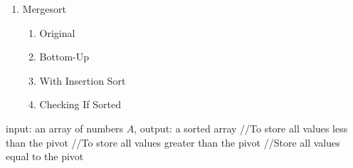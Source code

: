 \documentclass{IEEEtran}
\begin{document}
\begin{enumerate}
\item Mergesort
\begin{enumerate}
\item Original
\item Bottom-Up
\item With Insertion Sort
\item Checking If Sorted
\end{enumerate}

\end{enumerate}


\begin{algorithm}[h!]
    \begin{algorithmic}[1]
         {input:  an array of numbers $A$, output: a sorted array}
              //To store all values less than the pivot
              //To store all values greater than the pivot
                //Store all values equal to the pivot
                \Else{}
                \EndIf
            \EndFor{}  
            \State{} 
 
        \EndFunction{}
    \end{algorithmic}
\end{algorithm}
\end{document}
